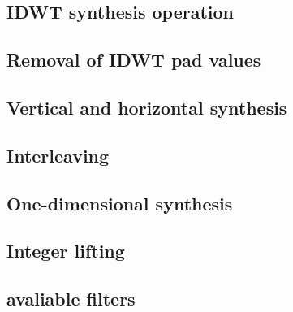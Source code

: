 

\subsection{IDWT synthesis operation}
\subsection{Removal of IDWT pad values}
\subsection{Vertical and horizontal synthesis}
\subsection{Interleaving}
\subsection{One-dimensional synthesis}
\subsection{Integer lifting}
\subsection{avaliable filters}
